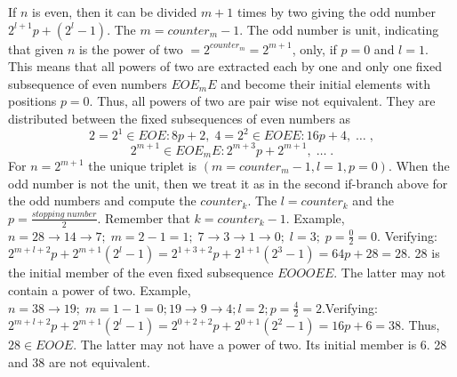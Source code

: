\documentclass{article}
\begin{document}
If $n$ is even, then it can be divided $m + 1$ times by two giving the odd number $2^{l + 1}p + (2^l -1)$. The $m = counter_m - 1$. The odd number is unit, indicating that given $n$ is the power of two $= 2^{counter_m} = 2^{m+1}$, only, if $p = 0$ and $l = 1$. This means that all powers of two are extracted each by one and only one fixed subsequence of even numbers $EOE_m{E}$ and become their initial elements with positions $p = 0$. Thus, all powers of two are pair wise not equivalent. They are distributed between the fixed subsequences of even numbers as
\begin{displaymath}
 2 = 2^1 \in EOE : 8p + 2, \; 4 = 2^2 \in EOEE : 16p + 4, \; \ldots \; ,
\end{displaymath}
\begin{displaymath}
 2^{m + 1} \in EOE_m{E}:2^{m + 3}p+2^{m+1}, \; \ldots \;.
\end{displaymath}
For $n = 2^{m+1}$ the unique triplet is $(m = counter_m - 1, l = 1, p = 0)$. When the odd number is not the unit, then we treat it as in the second if-branch above for the odd numbers and compute the $counter_k$. The $l = counter_k$ and the $p = \frac{stopping \; number}{2}$. Remember that $k = counter_k - 1$. Example, $n = 28 \to 14 \to 7; \; m = 2 - 1 = 1; \; 7 \to 3 \to 1 \to 0; \; l = 3; \; p = \frac{0}{2} = 0$. Verifying: $2^{m + l + 2}p + 2^{m+1}(2^l -1) = 2^{1 + 3 + 2}p + 2^{1+1}(2^3 -1) = 64p + 28 = 28$. 28 is the initial member of the even fixed subsequence $EOOOEE$. The latter may not contain a power of two. Example, $n = 38 \to 19; \; m = 1 - 1 = 0; 19 \to 9 \to 4; l = 2; p = \frac{4}{2} = 2$.Verifying: $2^{m + l + 2}p + 2^{m+1}(2^l -1) = 2^{0 + 2 + 2}p + 2^{0+1}(2^2 -1) = 16p + 6 = 38$. Thus, $28 \in EOOE$. The latter may not have a power of two. Its initial member is $6$. 28 and 38 are not equivalent.
\end{document}
